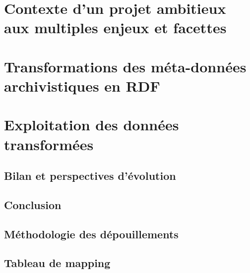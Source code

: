 \documentclass[a4paper, 12pt, twoside]{book}
\begin{document}
\part{Contexte d'un projet ambitieux aux multiples enjeux et facettes}


\part{Transformations des méta-données archivistiques en RDF}



\part{Exploitation des données transformées}



\chapter*{Bilan et perspectives d'évolution}


\chapter*{Conclusion}


\appendix

\chapter{Méthodologie des dépouillements}


\chapter{Tableau de mapping}

\end{document}
